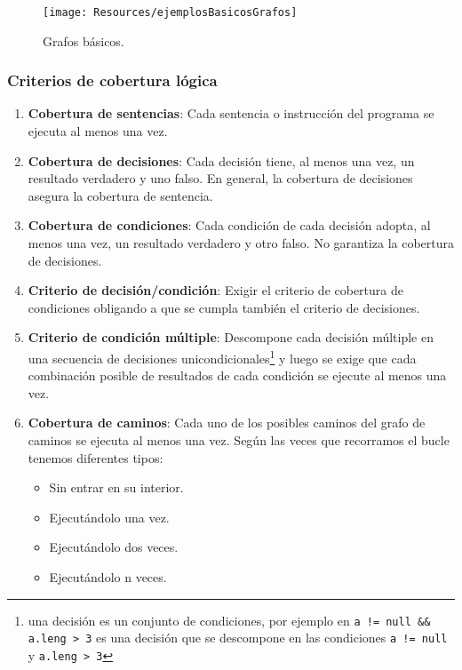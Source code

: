 \begin{figure}[H]
    \centering
    \texttt{[image: Resources/ejemplosBasicosGrafos]}
    \caption{Grafos básicos.}
    \label{fig:ejemplobasicografos}
\end{figure}

\subsubsection{Criterios de cobertura lógica}

\begin{enumerate}
    \item \textbf{Cobertura de sentencias}: Cada sentencia o instrucción del programa se ejecuta al menos una vez.

    \item \textbf{Cobertura de decisiones}: Cada decisión tiene, al menos una vez, un resultado verdadero y uno falso. En general, la cobertura de decisiones asegura la cobertura de sentencia.

    \item \textbf{Cobertura de condiciones}: Cada condición de cada decisión adopta, al menos una vez, un resultado verdadero y otro falso. No garantiza la cobertura de decisiones.

    \item \textbf{Criterio de decisión/condición}: Exigir el criterio de cobertura de condiciones obligando a que se cumpla también el criterio de decisiones.

    \item \textbf{Criterio de condición múltiple}: Descompone cada decisión múltiple en una secuencia de decisiones unicondicionales\footnote{una decisión es un conjunto de condiciones, por ejemplo en
              \texttt{a != null \&\& a.leng > 3} es una decisión que se descompone en las condiciones \texttt{a != null} y \texttt{a.leng > 3}} y luego se exige que cada combinación posible de resultados de cada condición se ejecute al menos una vez. %

    \item \textbf{Cobertura de caminos}: Cada uno de los posibles caminos del grafo de caminos  se ejecuta al menos una vez. Según las veces que recorramos el bucle tenemos diferentes tipos:
          \begin{itemize}
              \item Sin entrar en su interior.
              \item Ejecutándolo una vez.
              \item Ejecutándolo dos veces.
              \item Ejecutándolo n veces.
          \end{itemize}
\end{enumerate}




